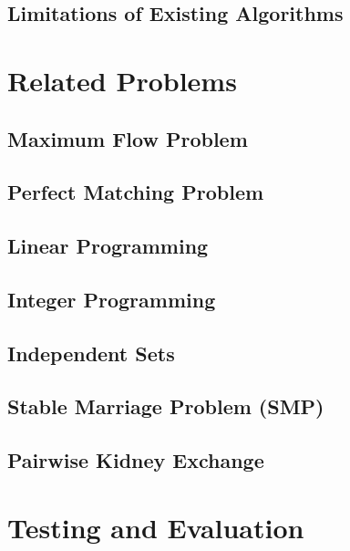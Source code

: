 \documentclass[condensed]{union-cs-thesis}
\begin{document}
\section{Limitations of Existing Algorithms}
\label{sec:limitations}


\chapter{Related Problems}
\label{sec:related}

\section{Maximum Flow Problem}
\label{sec:max_flow}


\section{Perfect Matching Problem}
\label{sec:perfect_matching}


\section{Linear Programming}
\label{sec:linear_programming}


\section{Integer Programming}
\label{sec:integer_programming}
\label{IP}


\section{Independent Sets} \label{sec:IndSets}


\section{Stable Marriage Problem (SMP)}
\label{sec:smp}


\section{Pairwise Kidney Exchange}
\label{sec:kidney_exchange}

\chapter{Testing and Evaluation}
\end{document}

